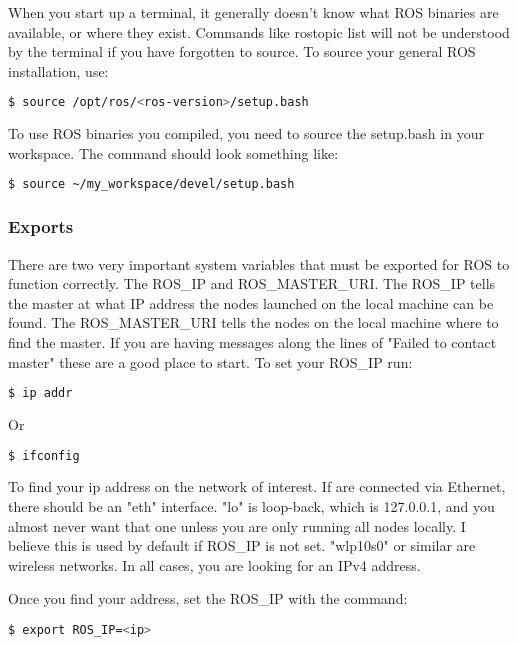 When you start up a terminal, it generally doesn't know what ROS binaries are available, or where they exist. Commands like rostopic list will not be understood by the terminal if you have forgotten to source. To source your general ROS installation, use: 

\begin{lstlisting}[language=bash]
  $ source /opt/ros/<ros-version>/setup.bash
\end{lstlisting}

To use ROS binaries you compiled, you need to source the setup.bash in your workspace. The command should look something like:

\begin{lstlisting}[language=bash]
  $ source ~/my_workspace/devel/setup.bash
\end{lstlisting}

\subsubsection{Exports}

There are two very important system variables that must be exported for ROS to function correctly. The ROS\_IP and ROS\_MASTER\_URI. The ROS\_IP tells the master at what IP address the nodes launched on the local machine can be found. The ROS\_MASTER\_URI tells the nodes on the local machine where to find the master. If you are having messages along the lines of "Failed to contact master" these are a good place to start. To set your ROS\_IP run:

\begin{lstlisting}[language=bash]
  $ ip addr
\end{lstlisting} 

Or

\begin{lstlisting}[language=bash]
  $ ifconfig
\end{lstlisting} 

To find your ip address on the network of interest. If are connected via Ethernet, there should be an "eth" interface. "lo" is loop-back, which is 127.0.0.1, and you almost never want that one unless you are only running all nodes locally. I believe this is used by default if ROS\_IP is not set. "wlp10s0" or similar are wireless networks. In all cases, you are looking for an IPv4 address.

Once you find your address, set the ROS\_IP with the command:

\begin{lstlisting}[language=bash]
  $ export ROS_IP=<ip>
\end{lstlisting} 

